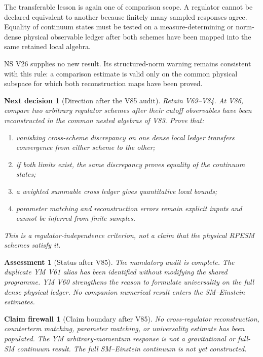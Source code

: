 \documentclass[11pt]{article}
\newtheorem{firewall}[theorem]{Claim firewall}
\newtheorem{decision}[theorem]{Next decision}
\newtheorem{assessment}[theorem]{Assessment}
\theoremstyle{remark}
\begin{document}
The transferable lesson is again one of comparison scope.  A
regulator cannot be declared equivalent to another because finitely
many sampled responses agree.  Equality of continuum states must be
tested on a measure-determining or norm-dense physical observable
ledger after both schemes have been mapped into the same retained
local algebra.

NS V26 supplies no new result.  Its structured-norm warning remains
consistent with this rule: a comparison estimate is valid only on
the common physical subspace for which both reconstruction maps have
been proved.

\begin{decision}[Direction after the V85 audit]
\label{dec:v12v85-next}
Retain V69--V84.  At V86, compare two arbitrary regulator schemes
after their cutoff observables have been reconstructed in the common
nested algebras of V83.  Prove that:
\begin{enumerate}
\item vanishing cross-scheme discrepancy on one dense local ledger
      transfers convergence from either scheme to the other;
\item if both limits exist, the same discrepancy proves equality of
      the continuum states;
\item a weighted summable cross ledger gives quantitative local
      bounds;
\item parameter matching and reconstruction errors remain explicit
      inputs and cannot be inferred from finite samples.
\end{enumerate}
This is a regulator-independence criterion, not a claim that the
physical RPESM schemes satisfy it.
\end{decision}

\begin{assessment}[Status after V85]
\label{ass:v12v85-status}
The mandatory audit is complete.  The duplicate YM V61 alias has
been identified without modifying the shared programme.  YM V60
strengthens the reason to formulate universality on the full dense
physical ledger.  No companion numerical result enters the
SM--Einstein estimates.
\end{assessment}

\begin{firewall}[Claim boundary after V85]
\label{fire:v12v85-claim}
No cross-regulator reconstruction, counterterm matching, parameter
matching, or universality estimate has been populated.  The YM
arbitrary-momentum response is not a gravitational or full-SM
continuum result.  The full SM--Einstein continuum is not yet
constructed.
\end{firewall}
\end{document}
